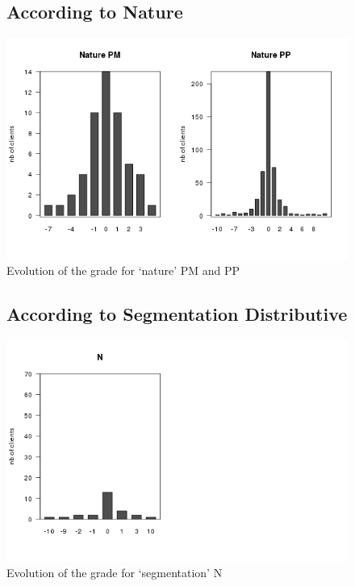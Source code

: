 \documentclass[a4paper, 11pt]{article}
\begin{document}
    \begin{figure}[!ht]
			\subsection{According to Nature}
            \centering
            \includegraphics[height = 10 cm]{Remi/Evolution_of_the_grade_for_nature_PP.png}
            \caption{Evolution of the grade for `nature' PM and PP}
            \label{fig:e_PP}
    \end{figure}

    \begin{figure}[!ht]
			\subsection{According to Segmentation Distributive}
            \centering
            \includegraphics[height = 10 cm]{Remi/Evolution_of_the_grade_for_segmentation_N.png}
            \caption{Evolution of the grade for `segmentation' N}
            \label{fig:e_seg_N}
    \end{figure}
\end{document}
